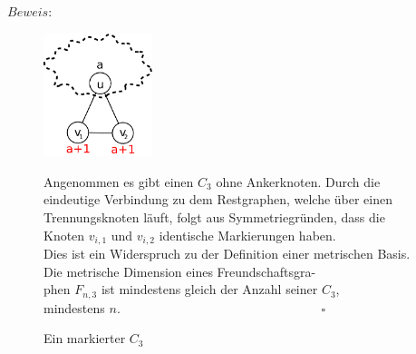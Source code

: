 $Beweis:$
\vspace{-7mm}
\begin{figure}
\vspace{-7mm}
\begin{minipage}[l]{170pt}
\centering
\includegraphics[width=90pt]{bilder/freundschaftsgraphbew.pdf}
\caption{Ein markierter $C_3$}
\end{minipage}
\begin{minipage}[r]{250pt}
Angenommen es gibt einen $C_3$ ohne Ankerknoten. Durch die eindeutige Verbindung zu dem Restgraphen, welche über einen Trennungsknoten läuft, folgt aus Symmetriegründen, dass die Knoten $v_{i,1}$ und $v_{i,2}$ identische Markierungen haben.\\Dies ist ein Widerspruch zu der Definition einer metrischen Basis.\\
Die metrische Dimension eines Freundschaftsgra-\\phen $F_{n,3}$ ist mindestens gleich der Anzahl seiner $C_{3}$,\\mindestens $n$.$\;\;\;\;\;\;\;\;\;\;\;\;\;\;\;\;\;\;\;\;\;\;\;\;\;\;\;\;\;\;\;\;\;\;\;\;\;\;\;\;\;\;\;\;\;\;\;\;\;\;\;\;\;\;\;\;\;\square$
\end{minipage}
\end{figure}

